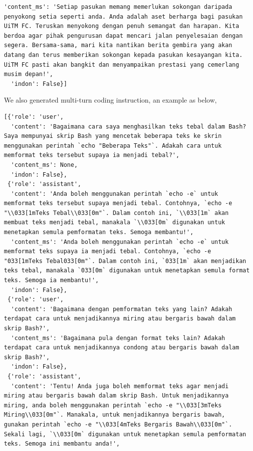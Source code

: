 \documentclass{article}
\begin{document}
\begin{lstlisting}[breaklines=true]
  'content_ms': 'Setiap pasukan memang memerlukan sokongan daripada penyokong setia seperti anda. Anda adalah aset berharga bagi pasukan UiTM FC. Teruskan menyokong dengan penuh semangat dan harapan. Kita berdoa agar pihak pengurusan dapat mencari jalan penyelesaian dengan segera. Bersama-sama, mari kita nantikan berita gembira yang akan datang dan terus memberikan sokongan kepada pasukan kesayangan kita. UiTM FC pasti akan bangkit dan menyampaikan prestasi yang cemerlang musim depan!',
  'indon': False}]
\end{lstlisting}

We also generated multi-turn coding instruction, an example as below,

\begin{lstlisting}[breaklines=true]
  [{'role': 'user',
  'content': 'Bagaimana cara saya menghasilkan teks tebal dalam Bash? Saya mempunyai skrip Bash yang mencetak beberapa teks ke skrin menggunakan perintah `echo "Beberapa Teks"`. Adakah cara untuk memformat teks tersebut supaya ia menjadi tebal?',
  'content_ms': None,
  'indon': False},
 {'role': 'assistant',
  'content': 'Anda boleh menggunakan perintah `echo -e` untuk memformat teks tersebut supaya menjadi tebal. Contohnya, `echo -e "\\033[1mTeks Tebal\\033[0m"`. Dalam contoh ini, `\\033[1m` akan membuat teks menjadi tebal, manakala `\\033[0m` digunakan untuk menetapkan semula pemformatan teks. Semoga membantu!',
  'content_ms': 'Anda boleh menggunakan perintah `echo -e` untuk memformat teks supaya ia menjadi tebal. Contohnya, `echo -e "033[1mTeks Tebal033[0m"`. Dalam contoh ini, `033[1m` akan menjadikan teks tebal, manakala `033[0m` digunakan untuk menetapkan semula format teks. Semoga ia membantu!',
  'indon': False},
 {'role': 'user',
  'content': 'Bagaimana dengan pemformatan teks yang lain? Adakah terdapat cara untuk menjadikannya miring atau bergaris bawah dalam skrip Bash?',
  'content_ms': 'Bagaimana pula dengan format teks lain? Adakah terdapat cara untuk menjadikannya condong atau bergaris bawah dalam skrip Bash?',
  'indon': False},
 {'role': 'assistant',
  'content': 'Tentu! Anda juga boleh memformat teks agar menjadi miring atau bergaris bawah dalam skrip Bash. Untuk menjadikannya miring, anda boleh menggunakan perintah `echo -e "\\033[3mTeks Miring\\033[0m"`. Manakala, untuk menjadikannya bergaris bawah, gunakan perintah `echo -e "\\033[4mTeks Bergaris Bawah\\033[0m"`. Sekali lagi, `\\033[0m` digunakan untuk menetapkan semula pemformatan teks. Semoga ini membantu anda!',

\end{lstlisting}
\end{document}
